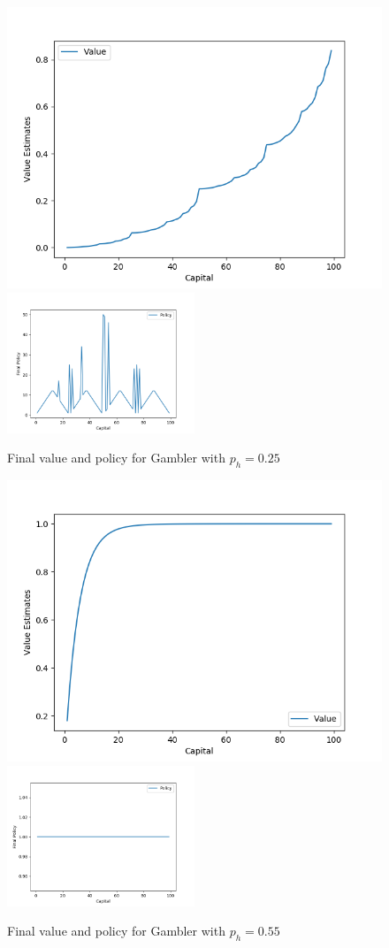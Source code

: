 \documentclass[10pt,letterpaper]{article}
\begin{document}
\begin{figure}[htp]
  \includegraphics[width=.5\textwidth]{Gambler_p_0_25_value}
  \includegraphics[width=0.5\textwidth]{Gambler_p_0_25_policy}
  \caption{Final value and policy for Gambler with $p_h = 0.25$}
  \label{fig:gambler_25}
\end{figure}

\begin{figure}[htp]
  \includegraphics[width=.5\textwidth]{Gambler_p_0_55_value}
  \includegraphics[width=0.5\textwidth]{Gambler_p_0_55_policy}
  \caption{Final value and policy for Gambler with $p_h = 0.55$}
  \label{fig:gambler_55}
\end{figure}
\end{document}
